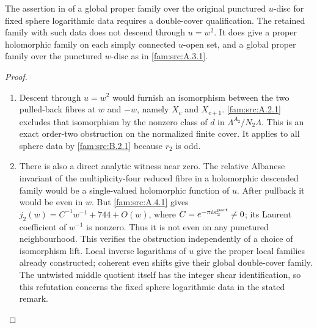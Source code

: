 \begin{proposition}\hypertarget{tag-01QD}{}\label{fam:src:B.2.3}\label{fam:st:B.2.3}

The assertion in \cite[Remark 8.1]{Engel2026} of a global proper family over the original punctured $u$-disc for fixed sphere logarithmic data requires a double-cover qualification. The retained family with such data does not descend through $u=w^2$. It does give a proper holomorphic family on each simply connected $u$-open set, and a global proper family over the punctured $w$-disc as in \ref{fam:src:A.3.1}.
\end{proposition}


\begin{proof}
\begin{enumerate}[label=\arabic*.,leftmargin=*]
\item Descent through $u=w^2$ would furnish an isomorphism between the two pulled-back fibres at $w$ and $-w$, namely $X_c$ and $X_{c+1}$. \ref{fam:src:A.2.1} excludes that isomorphism by the nonzero class of $d$ in $\Lambda^{A_2}/N_2\Lambda$. This is an exact order-two obstruction on the normalized finite cover. It applies to all sphere data by \ref{fam:src:B.2.1} because $r_2$ is odd.

\item There is also a direct analytic witness near zero. The relative Albanese invariant of the multiplicity-four reduced fibre in a holomorphic descended family would be a single-valued holomorphic function of $u$. After pullback it would be even in $w$. But \ref{fam:src:A.4.1} gives $j_2(w)=C^{-1}w^{-1}+744+O(w)$, where $C=e^{-\pi i\kappa_2^{\rm part}}\ne0$; its Laurent coefficient of $w^{-1}$ is nonzero. Thus it is not even on any punctured neighbourhood. This verifies the obstruction independently of a choice of isomorphism lift. Local inverse logarithms of $u$ give the proper local families already constructed; coherent even shifts give their global double-cover family. The untwisted middle quotient itself has the integer shear identification, so this refutation concerns the fixed sphere logarithmic data in the stated remark.
\end{enumerate}
\end{proof}